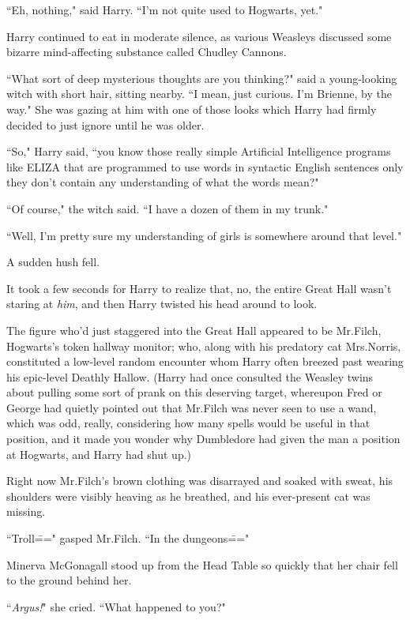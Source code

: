 ``Eh, nothing," said Harry. ``I'm not quite used to Hogwarts, yet."

Harry continued to eat in moderate silence, as various Weasleys discussed some bizarre mind-affecting substance called Chudley Cannons.

``What sort of deep mysterious thoughts are you thinking?" said a young-looking witch with short hair, sitting nearby. ``I mean, just curious. I'm Brienne, by the way." She was gazing at him with one of those looks which Harry had firmly decided to just ignore until he was older.

``So," Harry said, ``you know those really simple Artificial Intelligence programs like ELIZA that are programmed to use words in syntactic English sentences only they don't contain any understanding of what the words mean?"

``Of course," the witch said. ``I have a dozen of them in my trunk."

``Well, I'm pretty sure my understanding of girls is somewhere around that level."

A sudden hush fell.

It took a few seconds for Harry to realize that, no, the entire Great Hall wasn't staring at \emph{him}, and then Harry twisted his head around to look.

The figure who'd just staggered into the Great Hall appeared to be Mr.\?Filch, Hogwarts's token hallway monitor; who, along with his predatory cat Mrs.\?Norris, constituted a low-level random encounter whom Harry often breezed past wearing his epic-level Deathly Hallow. (Harry had once consulted the Weasley twins about pulling some sort of prank on this deserving target, whereupon Fred or George had quietly pointed out that Mr.\?Filch was never seen to use a wand, which was odd, really, considering how many spells would be useful in that position, and it made you wonder why Dumbledore had given the man a position at Hogwarts, and Harry had shut up.)

Right now Mr.\?Filch's brown clothing was disarrayed and soaked with sweat, his shoulders were visibly heaving as he breathed, and his ever-present cat was missing.

``Troll\===" gasped Mr.\?Filch. ``In the dungeons\==="

\later

Minerva McGonagall stood up from the Head Table so quickly that her chair fell to the ground behind her.

``\emph{Argus!}" she cried. ``What happened to you?"


